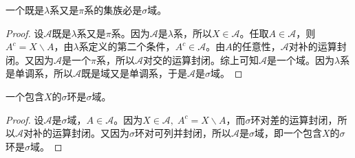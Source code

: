 \begin{theorem}\label{theo:Lambda+Pi=Sigma}
	一个既是$\lambda$系又是$\pi$系的集族必是$\sigma$域。
\end{theorem}
\begin{proof}
	设$\mathscr{A}$既是$\lambda$系又是$\pi$系。因为$\mathscr{A}$是$\lambda$系，所以$X\in\mathscr{A}$。任取$A\in\mathscr{A}$，则$A^c=X\backslash A$，由$\lambda$系定义的第二个条件，$A^c\in\mathscr{A}$。由$A$的任意性，$\mathscr{A}$对补的运算封闭。又因为$\mathscr{A}$是一个$\pi$系，所以$\mathscr{A}$对交的运算封闭。综上可知$\mathscr{A}$是一个域。因为$\lambda$系是单调系，所以$\mathscr{A}$既是域又是单调系，于是$\mathscr{A}$是$\sigma$域。
\end{proof}
\begin{theorem}
	一个包含$X$的$\sigma$环是$\sigma$域。
\end{theorem}
\begin{proof}
	设$\mathscr{A}$是$\sigma$域，$A\in\mathscr{A}$。因为$X\in\mathscr{A},\;A^c=X\backslash A$，而$\sigma$环对差的运算封闭，所以$\mathscr{A}$对补的运算封闭。又因为$\sigma$环对可列并封闭，所以$\mathscr{A}$是$\sigma$域，即一个包含$X$的$\sigma$环是$\sigma$域。
\end{proof}

